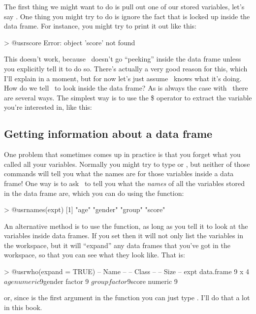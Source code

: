 The first thing we might want to do is pull out one of our stored variables, let's say . One thing you might try to do is ignore the fact that  is locked up inside the  data frame. For instance, you might try to print it out like this:
\begin{rblock1}
> @usr{score}
Error: object 'score' not found
\end{rblock1}
This doesn't work, because \R\ doesn't go ``peeking'' inside the data frame unless you explicitly tell it to do so. There's actually a very good reason for this, which I'll explain in a moment, but for now let's just assume \R\ knows what it's doing. How do we tell \R\ to look inside the data frame? As is always the case with \R\ there are several ways. The simplest way is to use the \$ operator to extract the variable you're interested in, like this:




\subsection{Getting information about a data frame}

One problem that sometimes comes up in practice is that you forget what you called all your variables. Normally you might try to type  or , but neither of those commands will tell you what the names are for those variables inside a data frame! One way is to ask \R\ to tell you what the {\it names} of all the variables stored in the data frame are, which you can do using the  function:
\begin{rblock1}
> @usr{names(expt)}
[1] "age"    "gender" "group"  "score" 
\end{rblock1}
An alternative method is to use the  function, as long as you tell it to look at the variables inside data frames. If you set  then it will not only list the variables in the workspace, but it will ``expand'' any data frames that you've got in the workspace, so that you can see what they look like. That is:
\begin{rblock1}
> @usr{who(expand = TRUE)}
   -- Name --   -- Class --   -- Size --
   expt         data.frame    9 x 4     
    $age        numeric       9         
    $gender     factor        9         
    $group      factor        9         
    $score      numeric       9         
\end{rblock1}
or, since  is the first argument in the  function you can just type . I'll do that a lot in this book.


